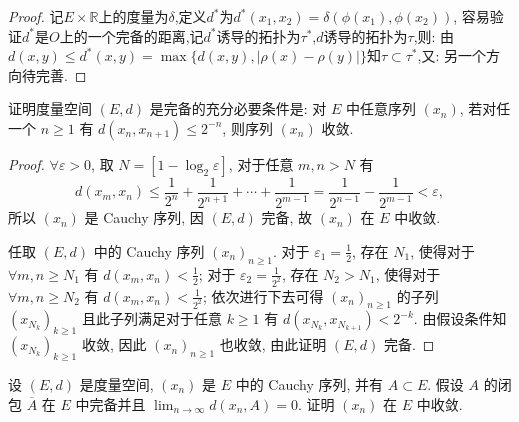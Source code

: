 \begin{proof}
    记$E\times\mathbb{R}$上的度量为$\delta$,定义$d^*$为$d^*(x_1,x_2)=\delta(\phi(x_1),\phi(x_2))$,
    容易验证$d^*$是$O$上的一个完备的距离,记$d^*$诱导的拓扑为$\tau^*$,$d$诱导的拓扑为$\tau$,则:
    由$d(x,y)\leq d^*(x,y)=\max\{d(x,y),|\rho(x)-\rho(y)|\}$知$\tau\subset\tau^*$,又:
    另一个方向待完善.
\end{proof}


\begin{exercise}
    证明度量空间 $(E,d)$ 是完备的充分必要条件是: 
    对 $E$ 中任意序列 $(x_n)$, 若对任一个 $n\geq 1$ 有 $d(x_n,x_{n+1})\leq 2^{-n}$, 则序列 $(x_n)$ 收敛.
\end{exercise}

\begin{proof}
    \necessary
    $\forall\varepsilon>0$, 取 $N=[1-\log_2\varepsilon]$, 对于任意 $m,n>N$ 有
    \[d(x_m,x_n)\leq \frac{1}{2^n}+\frac{1}{2^{n+1}}+\cdots+\frac{1}{2^{m-1}}=\frac{1}{2^{n-1}}-\frac{1}{2^{m-1}}<\varepsilon,\]
    所以 $(x_n)$ 是 Cauchy 序列, 因 $(E,d)$ 完备, 故 $(x_n)$ 在 $E$ 中收敛.
    
    \sufficient 任取 $(E,d)$ 中的 Cauchy 序列 $(x_n)_{n\geq 1}$.
    对于 $\varepsilon_1=\frac{1}{2}$, 存在 $N_1$, 使得对于 $\forall m,n\geq N_1$
    有 $d(x_m,x_n)<\frac{1}{2}$;
    对于 $\varepsilon_2=\frac{1}{2^2}$, 存在 $N_2>N_1$, 使得对于 $\forall m,n\geq N_2$
    有 $d(x_m,x_n)<\frac{1}{2^2}$;
    依次进行下去可得 $(x_n)_{n\geq 1}$ 的子列 $(x_{N_k})_{k\geq 1}$
    且此子列满足对于任意 $k\geq 1$ 有 $d(x_{N_k},x_{N_{k+1}})<2^{-k}$.
    由假设条件知 $(x_{N_k})_{k\geq 1}$ 收敛, 因此 $(x_n)_{n\geq 1}$ 也收敛,
    由此证明 $(E,d)$ 完备.
\end{proof}


\begin{exercise}
    设 $(E,d)$ 是度量空间, $(x_n)$ 是 $E$ 中的  Cauchy 序列, 并有 $A\subset E$.
    假设 $A$ 的闭包 $\overline{A}$ 在 $E$ 中完备并且 $\lim_{n\to\infty}d(x_n,A)=0$.
    证明 $(x_n)$ 在 $E$ 中收敛.
\end{exercise}

